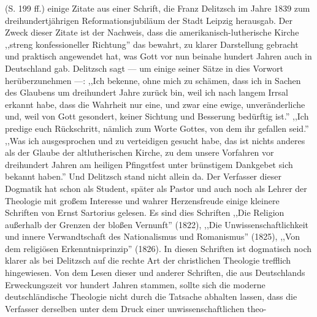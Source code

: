 (S. 199 ff.) einige Zitate aus einer Schrift, die Franz Delitzsch im Jahre 1839 zum dreihundertjährigen Reformationsjubiläum der Stadt Leipzig herausgab. Der Zweck dieser Zitate ist der Nachweis, dass die amerikanisch-lutherische Kirche ,,streng konfessioneller Richtung'' das bewahrt, zu klarer Darstellung gebracht und praktisch angewendet hat, was Gott vor nun beinahe hundert Jahren auch in Deutschland gab. Delitzsch sagt — um einige seiner Sätze in dies Vorwort herüberzunehmen —: ,,Ich bekenne, ohne mich zu schämen, dass ich in Sachen des Glaubens um dreihundert Jahre zurück bin, weil ich nach langem Irrsal erkannt habe, dass die Wahrheit nur eine, und zwar eine ewige, unveränderliche und, weil von Gott gesondert, keiner Sichtung und Besserung bedürftig ist.'' ,,Ich predige euch Rückschritt, nämlich zum Worte Gottes, von dem ihr gefallen seid.'' ,,Was ich ausgesprochen und zu verteidigen gesucht habe, das ist nichts anderes als der Glaube der altlutherischen Kirche, zu dem unsere Vorfahren vor dreihundert Jahren am heiligen Pfingstfest unter brünstigem Dankgebet sich bekannt haben.'' Und Delitzsch stand nicht allein da. Der Verfasser dieser Dogmatik hat schon als Student, später als Pastor und auch noch als Lehrer der Theologie mit großem Interesse und wahrer Herzensfreude einige kleinere Schriften von Ernst Sartorius gelesen. Es sind dies Schriften ,,Die Religion außerhalb der Grenzen der bloßen Vernunft'' (1822), ,,Die Unwissenschaftlichkeit und innere Verwandtschaft des Nationalismus und Romanismus'' (1825), ,,Von dem religiösen Erkenntnisprinzip'' (1826). In diesen Schriften ist dogmatisch noch klarer als bei Delitzsch auf die rechte Art der christlichen Theologie trefflich hingewiesen. Von dem Lesen dieser und anderer Schriften, die aus Deutschlands Erweckungszeit vor hundert Jahren stammen, sollte sich die moderne deutschländische Theologie nicht durch die Tatsache abhalten lassen, dass die Verfasser derselben unter dem Druck einer unwissenschaftlichen theo-